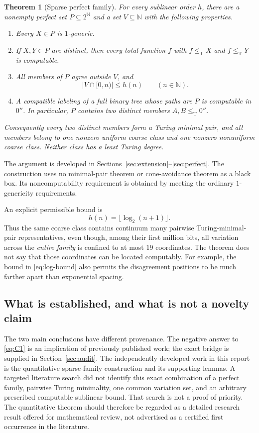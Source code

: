 \documentclass[11pt,a4paper]{article}
\newcommand{\N}{\mathbb N}
\newcommand{\Cantor}{2^{\N}}
\newcommand{\leT}{\leq_{\mathrm T}}
\newtheorem{theorem}{Theorem}[section]
\theoremstyle{definition}\newtheorem{definition}[theorem]{Definition}
\theoremstyle{remark}\newtheorem{remark}[theorem]{Remark}
\begin{document}
\begin{theorem}[Sparse perfect family]\label{thm:main}
For every sublinear order $h$, there are a nonempty perfect set
$P\subseteq\Cantor$ and a set $V\subseteq\N$ with the following properties.
\begin{enumerate}[label=\textup{(\roman*)}]
\item Every $X\in P$ is $1$-generic.
\item If $X,Y\in P$ are distinct, then every total function $f$ with
$f\leT X$ and $f\leT Y$ is computable.
\item All members of $P$ agree outside $V$, and
\begin{equation}\label{eq:budget-main}
                 |V\cap[0,n)|\le h(n)\qquad(n\in\N).
\end{equation}
\item A compatible labeling of a full binary tree whose paths are $P$ is
computable in $0''$. In particular, $P$ contains two distinct members
$A,B\leT0''$.
\end{enumerate}
Consequently every two distinct members form a Turing minimal pair, and all
members belong to one nonzero uniform coarse class and one nonzero nonuniform
coarse class. Neither class has a least Turing degree.
\end{theorem}

The argument is developed in Sections~\ref{sec:extension}--\ref{sec:perfect}.
The construction uses no minimal-pair theorem or cone-avoidance theorem as a
black box. Its noncomputability requirement is obtained by meeting the
ordinary $1$-genericity requirements.

An explicit permissible bound is
\begin{equation}\label{eq:log-bound}
                     h(n)=\lfloor\log_2(n+1)\rfloor.
\end{equation}
Thus the same coarse class contains continuum many pairwise Turing-minimal-pair
representatives, even though, among their first million bits, all variation
across the \emph{entire family} is confined to at most $19$ coordinates.
The theorem does not say that those coordinates can be located computably.
For example, the bound in \eqref{eq:log-bound} also permits the disagreement
positions to be much farther apart than exponential spacing.

\subsection{What is established, and what is not a novelty claim}
The two main conclusions have different provenance. The negative answer to
\eqref{eq:C1} is an implication of previously published work; the exact bridge
is supplied in Section~\ref{sec:audit}. The independently developed work in
this report is the quantitative sparse-family construction and its supporting
lemmas. A targeted literature search did not identify this exact combination
of a perfect family, pairwise Turing minimality, one common variation set, and
an arbitrary prescribed computable sublinear bound. That search is not a
proof of priority. The quantitative theorem should therefore be regarded as
a detailed research result offered for mathematical review, not advertised as
a certified first occurrence in the literature.
\end{document}
